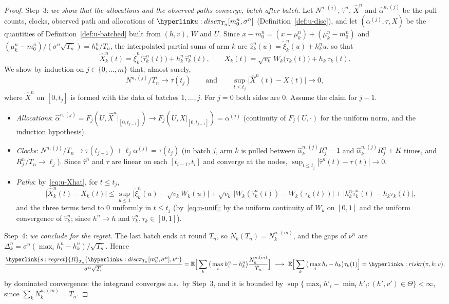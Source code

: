 \documentclass[11pt]{article}
\DeclareRobustCommand{\sy}[2]{{\hyperlink{#1}{#2}}}
\newcommand{\E}{\mathbb{E}}
\newcommand{\1}{\mathbf{1}}
\begin{document}
\begin{proof}
Step~3: \emph{we show that the allocations and the observed paths converge, batch after batch.} Let $N^{n,(j)}$, $\hat\tau^n$, $\hat X^n$ and $\hat\alpha^{n,(j)}$ be the
pull counts, clocks, observed path and allocations of $\uDisc{\pi}{T_n}{m^n_0,\sigma^n}$ (Definition~\ref{def:u-disc}), and let $(\alpha^{(j)},\tau,X)$ be the
quantities of Definition~\ref{def:u-batched} built from $(h,v)$, $W$ and $U$. Since $x-m^n_0=(x-\mu^n_k)+(\mu^n_k-m^n_0)$ and
$(\mu^n_k-m^n_0)/(\sigma^n\sqrt{T_n})=h^n_k/T_n$, the interpolated partial sums of arm $k$ are $\hat z^n_k(u)=\tilde\xi^n_k(u)+h^n_ku$, so that
\begin{equation}\label{eq:u-Xhat}
\hat X^n_k(t)=\tilde\xi^n_k\big(\hat\tau^n_k(t)\big)+h^n_k\,\hat\tau^n_k(t),\qquad X_k(t)=\sqrt{v_k}\,W_k\big(\tau_k(t)\big)+h_k\,\tau_k(t).
\end{equation}
We show by induction on $j\in\{0,\dots,m\}$ that, almost surely,
\[
N^{n,(j)}/T_n\to\tau(t_j)\qquad\text{and}\qquad\sup_{t\le t_j}\big|\hat X^n(t)-X(t)\big|\to0,
\]
where $\hat X^n$ on $[0,t_j]$ is formed with the data of batches $1,\dots,j$. For $j=0$ both sides are $0$. Assume the claim for $j-1$.
\begin{itemize}
\item \emph{Allocations}: $\hat\alpha^{n,(j)}=F_j(U,\hat X^n|_{[0,t_{j-1}]})\to F_j(U,X|_{[0,t_{j-1}]})=\alpha^{(j)}$ (continuity of $F_j(U,\cdot)$ for the uniform norm, and
the induction hypothesis).
\item \emph{Clocks}: $N^{n,(j)}/T_n\to\tau(t_{j-1})+\ell_j\alpha^{(j)}=\tau(t_j)$ (in batch $j$, arm $k$ is pulled between $\hat\alpha^{n,(j)}_kR^n_j-1$ and
$\hat\alpha^{n,(j)}_kR^n_j+K$ times, and $R^n_j/T_n\to\ell_j$). Since $\hat\tau^n$ and $\tau$ are linear on each $[t_{i-1},t_i]$ and converge at the nodes,
$\sup_{t\le t_j}|\hat\tau^n(t)-\tau(t)|\to0$.
\item \emph{Paths}: by~\eqref{eq:u-Xhat}, for $t\le t_j$,
\[
\big|\hat X^n_k(t)-X_k(t)\big|\le\sup_{u\le1}\big|\tilde\xi^n_k(u)-\sqrt{v_k}W_k(u)\big|+\sqrt{v_k}\,\big|W_k(\hat\tau^n_k(t))-W_k(\tau_k(t))\big|+\big|h^n_k\hat\tau^n_k(t)-h_k\tau_k(t)\big|,
\]
and the three terms tend to $0$ uniformly in $t\le t_j$ (by~\eqref{eq:u-unif}; by the uniform continuity of $W_k$ on $[0,1]$ and the uniform convergence of
$\hat\tau^n_k$; since $h^n\to h$ and $\hat\tau^n_k,\tau_k\in[0,1]$).
\end{itemize}

Step~4: \emph{we conclude for the regret.} The last batch ends at round $T_n$, so $N_k(T_n)=N^{n,(m)}_k$, and the gaps of $\nu^n$ are
$\Delta^n_k=\sigma^n(\max_ih^n_i-h^n_k)/\sqrt{T_n}$. Hence
\[
\frac{\sy{s:regret}{R}_{T_n}\big(\uDisc{\pi}{T_n}{m^n_0,\sigma^n},\nu^n\big)}{\sigma^n\sqrt{T_n}}=\E\Big[\sum_k\big(\max_ih^n_i-h^n_k\big)\frac{N^{n,(m)}_k}{T_n}\Big]
\ \longrightarrow\ \E\Big[\sum_k\big(\max_ih_i-h_k\big)\tau_k(1)\Big]=\urk(\pi,h;v),
\]
by dominated convergence: the integrand converges a.s.\ by Step~3, and it is bounded by $\sup\{\max_ih'_i-\min_ih'_i:(h',v')\in\Theta\}<\infty$, since
$\sum_kN^{n,(m)}_k=T_n$.


\end{proof}
\end{document}
